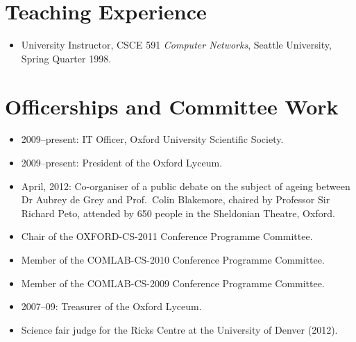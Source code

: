 \documentclass[letterpaper]{article}
\begin{document}
%
%
%
%
%

\section*{Teaching Experience} %

\begin{itemize}
    \item University Instructor, CSCE 591 \emph{Computer Networks},
    Seattle University, Spring Quarter 1998.
\end{itemize}

\section*{Officerships and Committee Work}
\begin{itemize}
	\item 2009--present: IT Officer, Oxford University Scientific Society.
	\item 2009--present: President of the Oxford Lyceum.
	\item April, 2012: Co-organiser of a public debate on the subject of ageing between
		Dr Aubrey de Grey and Prof.\ Colin Blakemore, chaired by Professor Sir Richard Peto,
		attended by 650 people in the Sheldonian Theatre, Oxford.
	\item Chair of the OXFORD-CS-2011 Conference Programme Committee.
	\item Member of the COMLAB-CS-2010 Conference Programme Committee.
	\item Member of the COMLAB-CS-2009 Conference Programme Committee.
	\item 2007--09: Treasurer of the Oxford Lyceum.
	\item Science fair judge for the Ricks Centre at the University of Denver (2012).
\end{itemize}
\end{document}
